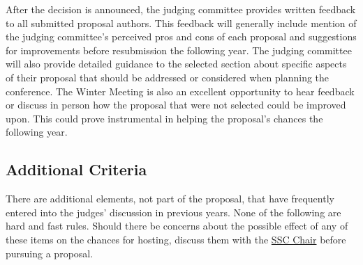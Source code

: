 \documentclass[12pt]{article}
\begin{document}
After the decision is announced, the judging committee provides written feedback to all submitted proposal authors. 
This feedback will generally include mention of the judging committee’s perceived pros and cons of each proposal and suggestions for improvements
before resubmission the following year. 
The judging committee will also provide
detailed guidance to the selected section about specific aspects of their proposal that should be addressed or considered when planning the conference. 
The Winter Meeting is also an excellent opportunity to hear feedback or discuss in person how the proposal that were not selected could be improved upon. 
This could prove instrumental in helping the proposal's chances the following year.

\subsection{Additional Criteria}
There are additional elements, not part of the proposal, that have frequently entered into the judges’ discussion in previous years. 
None of the following are hard and fast rules.
Should there be concerns about the possible effect of any of these items on the chances for hosting, discuss them with the \href{mailto:sscChair@gmail.com}{SSC Chair} before pursuing a proposal.
\end{document}
